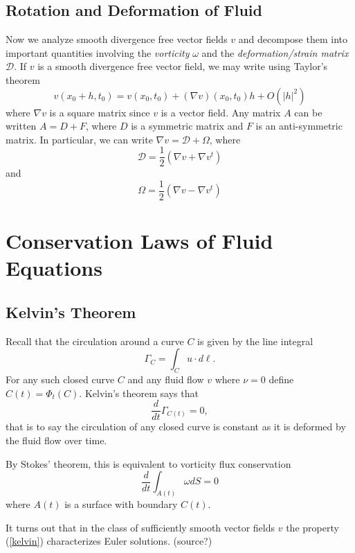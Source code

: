 \subsection{Rotation and Deformation of Fluid}

Now we analyze smooth divergence free vector fields $v$ and decompose them into important quantities involving the \textit{vorticity} $\omega$ and the \textit{deformation/strain matrix} $\mathcal{D}$. If $v$ is a smooth divergence free vector field, we may write using Taylor's theorem
\[v(x_0 + h, t_0) = v(x_0, t_0) + (\nabla v)(x_0, t_0)h + O(|h|^2)\]
where $\nabla v$ is a square matrix since $v$ is a vector field. Any matrix $A$ can be written $A = D + F$, where $D$ is a symmetric matrix and $F$ is an anti-symmetric matrix. In particular, we can write $\nabla v = \mathcal{D} + \Omega$, where
\begin{equation}
    \mathcal{D} = \frac{1}{2}(\nabla v + \nabla v^t)
\end{equation}
and 
\begin{equation}
    \Omega = \frac{1}{2}(\nabla v - \nabla v^t)
\end{equation}

\section{Conservation Laws of Fluid Equations}

\subsection{Kelvin's Theorem}
Recall that the circulation around a curve $C$ is given by the line integral
\begin{equation}
    \Gamma_C = \int_C u \cdot d\ell. \label{circulation}
\end{equation}
For any such closed curve $C$ and any fluid flow $v$ where $\nu = 0$ define $C(t) = \Phi_t(C)$. Kelvin's theorem says that 
\begin{equation} 
\frac{d}{dt}\Gamma_{C(t)} = 0, \label{kelvin}
\end{equation}
that is to say the circulation of any closed curve is constant as it is deformed by the fluid flow over time.

\begin{remark}
    By Stokes' theorem, this is equivalent to vorticity flux conservation
    \[\frac{d}{dt} \int_{A(t)} \omega dS = 0\]
    where $A(t)$ is a surface with boundary $C(t)$.
\end{remark}

\begin{remark}
    It turns out that in the class of sufficiently smooth vector fields $v$ the property (\ref{kelvin}) characterizes Euler solutions. (source?)
\end{remark}